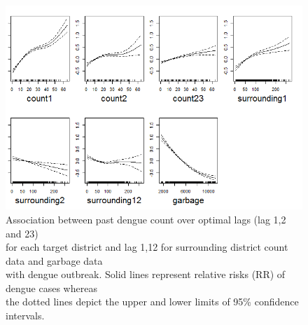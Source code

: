 \documentclass{bmcart}
\begin{document}


\begin{figure}[h!]
	\begin{center}
		\includegraphics[width= 0.97 \textwidth]{Fit-OptimalRepresentation+Garbage}
		\caption{Association between past dengue count over optimal lags (lag 1,2 and 23) \\ for each target district and lag 1,12 for surrounding district count data and garbage data \\ with dengue outbreak.  Solid lines represent relative risks (RR) of dengue cases whereas\\ the dotted lines depict the upper and lower limits of 95\% confidence intervals.}
		\label{figure-mostOptimalFit}
	\end{center}
\end{figure}
\end{document}
